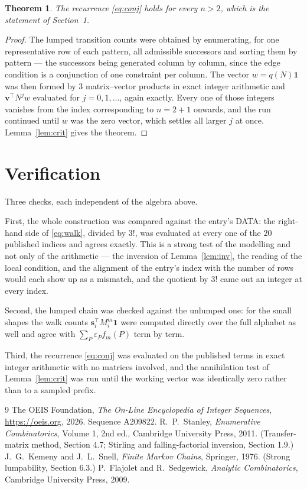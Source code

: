 \documentclass[11pt,a4paper]{article}
\theoremstyle{plain}
\newtheorem{theorem}{Theorem}
\theoremstyle{definition}
\begin{document}
\begin{theorem}
The recurrence \eqref{eq:conj} holds for every $n>2$, which is the statement of
Section~1.
\end{theorem}

\begin{proof}
The lumped transition counts were obtained by enumerating, for one representative row of
each pattern, all admissible successors and sorting them by pattern --- the successors being
generated column by column, since the edge condition is a conjunction of one constraint per
column. The vector $w=q(N)\mathbf{1}$ was then formed by $3$ matrix--vector products
in exact integer arithmetic and $\mathbf{v}^{\!\top}N^{j}w$ evaluated for
$j=0,1,\dots$, again exactly. Every one of those integers vanishes from the index
corresponding to $n=2+1$ onwards, and the run continued until $w$ was the zero vector,
which settles all larger $j$ at once. Lemma~\ref{lem:crit} gives the theorem.
\end{proof}

\section{Verification}

Three checks, each independent of the algebra above.

First, the whole construction was compared against the entry's DATA: the right-hand side of
\eqref{eq:walk}, divided by $3!$, was evaluated at every one of the $20$
published indices and agrees exactly. This is a strong test of the modelling and not only of
the arithmetic --- the inversion of Lemma~\ref{lem:inv}, the reading of the local
condition, and the alignment of the entry's index with the number of rows would each
show up as a mismatch, and the quotient by $3!$ came out an integer at every index.

Second, the lumped chain was checked against the unlumped one: for the small shapes the walk
counts $\mathbf{s}_i^{\!\top}M_i^{m}\mathbf{1}$ were computed directly over the full
alphabet as well and agree with $\sum_P\varepsilon_Pf_m(P)$ term by term.

Third, the recurrence \eqref{eq:conj} was evaluated on the published terms in exact integer
arithmetic with no matrices involved, and the annihilation test of Lemma~\ref{lem:crit} was
run until the working vector was identically zero rather than to a sampled prefix.

\begin{thebibliography}{9}
 The OEIS Foundation, \emph{The On-Line Encyclopedia of Integer
Sequences}, \url{https://oeis.org}, 2026. Sequence A209822.
 R.~P.~Stanley, \emph{Enumerative Combinatorics}, Volume 1, 2nd ed.,
Cambridge University Press, 2011. (Transfer-matrix method, Section 4.7; Stirling and
falling-factorial inversion, Section 1.9.)
 J.~G.~Kemeny and J.~L.~Snell, \emph{Finite Markov Chains}, Springer,
1976. (Strong lumpability, Section 6.3.)
 P.~Flajolet and R.~Sedgewick, \emph{Analytic Combinatorics}, Cambridge
University Press, 2009.
\end{thebibliography}
\end{document}
